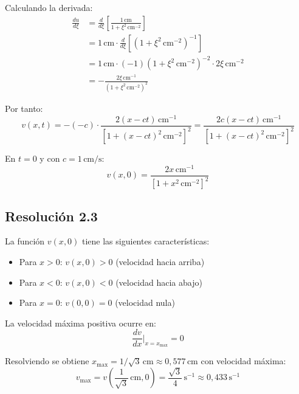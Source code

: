 \documentclass[
  11pt,
  letterpaper,
   addpoints,
   answers
  ]{exam}
\begin{document}
\begin{questions}
\begin{solution}
  Calculando la derivada:
  \begin{align}
    \frac{du}{d\xi} &= \frac{d}{d\xi}\left[\frac{1\,\mathrm{cm}}{1 + \xi^2\,\mathrm{cm}^{-2}}\right] \\
    &= 1\,\mathrm{cm} \cdot \frac{d}{d\xi}\left[(1 + \xi^2\,\mathrm{cm}^{-2})^{-1}\right] \\
    &= 1\,\mathrm{cm} \cdot (-1)(1 + \xi^2\,\mathrm{cm}^{-2})^{-2} \cdot 2\xi\,\mathrm{cm}^{-2} \\
    &= -\frac{2\xi\,\mathrm{cm}^{-1}}{(1 + \xi^2\,\mathrm{cm}^{-2})^2}
  \end{align}
  
  Por tanto:
  \begin{equation}
    v(x,t) = -(-c) \cdot \frac{2(x-ct)\,\mathrm{cm}^{-1}}{[1 + (x-ct)^2\,\mathrm{cm}^{-2}]^2} = \frac{2c(x-ct)\,\mathrm{cm}^{-1}}{[1 + (x-ct)^2\,\mathrm{cm}^{-2}]^2}
  \end{equation}
  
  En $t = 0$ y con $c = 1\,\mathrm{cm/s}$:
  \begin{equation}
    v(x,0) = \frac{2x\,\mathrm{cm}^{-1}}{[1 + x^2\,\mathrm{cm}^{-2}]^2}
  \end{equation}
  
  \subsection*{Resolución 2.3}
  
  La función $v(x,0)$ tiene las siguientes características:
  
  \begin{itemize}
    \item Para $x > 0$: $v(x,0) > 0$ (velocidad hacia arriba)
    \item Para $x < 0$: $v(x,0) < 0$ (velocidad hacia abajo)  
    \item Para $x = 0$: $v(0,0) = 0$ (velocidad nula)
  \end{itemize}
  
  La velocidad máxima positiva ocurre en:
  \begin{equation}
    \frac{dv}{dx}\bigg|_{x=x_{\max}} = 0
  \end{equation}
  
  Resolviendo se obtiene $x_{\max} = 1/\sqrt{3}\,\mathrm{cm} \approx 0{,}577\,\mathrm{cm}$ con velocidad máxima:
  \begin{equation}
    v_{\max} = v\left(\frac{1}{\sqrt{3}}\,\mathrm{cm}, 0\right) = \frac{\sqrt{3}}{4}\,\mathrm{s}^{-1} \approx 0{,}433\,\mathrm{s}^{-1}
  \end{equation}
  

\end{solution}
\end{questions}
\end{document}

